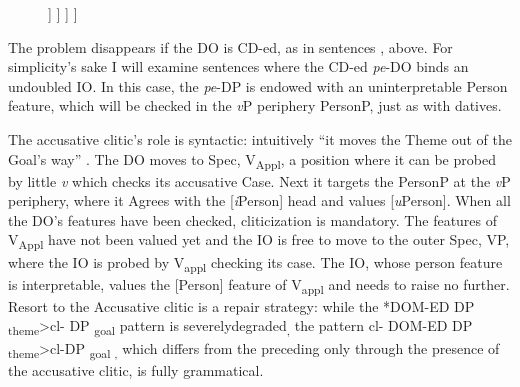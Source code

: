 \documentclass[output=paper,colorlinks,citecolor=brown,nonflat]{./langscibook}
\begin{document}
  \begin{figure}%
	\begin{forest}
		[\textit{v}P
			[\textit{v}
			]
			[V\textsubscript{Appl}P
				[V\textsubscript{Appl}\\
					{[}{\textit{u}}{Pers}{]}\\
					{[}\textit{u}Case:\textsc{acc}{]}
				]
				[VP
					[KP\textsubscript{DO}\\
						{[}{\textit{u}}{Pers}{]}
					]
					[V'
						[V\\
							{[}\textit{u}Case:Acc{]}
						]
						[KP\textsubscript{io}\\
							{[}{\textit{u}}{Pers}{]}\\
							{[}\textit{u}Case:Dat{]}
						]
					]
				]
			]
		]
	\end{forest}
	\caption{\label{fig:cornilescu:12} \missingcaption}
\end{figure}
      


The problem disappears if the DO is CD-ed, as in sentences ,  above. For simplicity’s sake I will examine sentences where the CD-ed \textit{pe}-DO binds an undoubled IO. In this case, the \textit{pe}-DP is endowed with an uninterpretable Person feature, which will be checked in the \textit{v}P periphery PersonP, just as with datives.

The accusative clitic’s role is syntactic: intuitively “it moves the Theme out of the Goal’s way” \citep{Anagnostopoulou2006}. The DO moves to Spec, V\textsubscript{Appl}, a position where it can be probed by little \textit{v} which checks its accusative Case. Next it targets the PersonP at the \textit{v}P periphery, where it Agrees with the [\textit{i}Person] head and values [\textit{u}Person]. When all the DO’s features have been checked, cliticization is mandatory. The features of V\textsubscript{Appl} have not been valued yet and the IO is free to move to the outer Spec, VP, where the IO is probed by V\textsubscript{appl} checking its case. The IO, whose person feature is interpretable, values the [Person] feature of V\textsubscript{appl} and needs to raise no further. Resort to the Accusative clitic is a repair strategy: while the *DOM-ED DP \textsubscript{theme}>{cl}{}- DP \textsubscript{goal} pattern is severelydegraded\textsubscript{,} the pattern {cl}{}- DOM-ED DP \textsubscript{theme}>{cl}{}-DP \textsubscript{goal ,} which differs from the preceding only through the presence of the accusative clitic, is fully grammatical.
\end{document}
